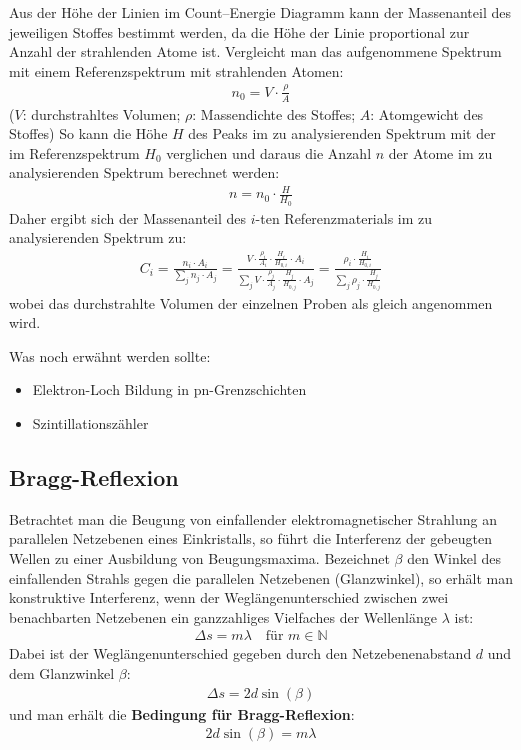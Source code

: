 \documentclass[10pt, a4paper]{article}
\begin{document}
Aus der Höhe der Linien im Count--Energie Diagramm kann der Massenanteil des jeweiligen Stoffes bestimmt werden, da die Höhe der Linie proportional zur Anzahl der strahlenden Atome ist.
Vergleicht man das aufgenommene Spektrum mit einem Referenzspektrum mit strahlenden Atomen:
\begin{align}
  n_0 = V \cdot \frac{\rho}{A}
\end{align}
($V$: durchstrahltes Volumen; $\rho$: Massendichte des Stoffes; $A$: Atomgewicht des Stoffes)
So kann die Höhe $H$ des Peaks im zu analysierenden Spektrum mit der im Referenzspektrum $H_0$ verglichen und daraus die Anzahl $n$ der Atome im zu analysierenden Spektrum berechnet werden:
\begin{align}
  n = n_0 \cdot \frac{H}{H_0}
\end{align}
Daher ergibt sich der Massenanteil des $i$-ten Referenzmaterials im zu analysierenden Spektrum zu:
\begin{align}
  C_i = \frac{n_i \cdot A_i}{\sum_j n_j \cdot A_j} = \frac{V \cdot \frac{\rho_i}{A_i} \cdot \frac{H_i}{H_{0,i}} \cdot A_i}{\sum_j V \cdot \frac{\rho_j}{A_j} \cdot \frac{H_j}{H_{0,j}}\cdot A_j} = \frac{\rho_i \cdot \frac{H_i}{H_{0,i}}}{\sum_j \rho_j \cdot \frac{H_j}{H_{0,j}}}
  \label{eq:masseanteile}
\end{align}
wobei das durchstrahlte Volumen der einzelnen Proben als gleich angenommen wird.

Was noch erwähnt werden sollte:
\begin{itemize}
  \item Elektron-Loch Bildung in pn-Grenzschichten
  \item Szintillationszähler
\end{itemize}

\subsection{Bragg-Reflexion}
Betrachtet man die Beugung von einfallender elektromagnetischer Strahlung an parallelen Netzebenen eines Einkristalls, so führt die Interferenz der gebeugten Wellen zu einer Ausbildung von Beugungsmaxima.
Bezeichnet $\beta$ den Winkel des einfallenden Strahls gegen die parallelen Netzebenen (Glanzwinkel), so erhält man konstruktive Interferenz, wenn der Weglängenunterschied zwischen zwei benachbarten Netzebenen ein ganzzahliges Vielfaches der Wellenlänge $\lambda$ ist:
\begin{align}
  \Delta s = m \lambda \quad \text{für } m \in \mathbb{N}
\end{align}
Dabei ist der Weglängenunterschied gegeben durch den Netzebenenabstand $d$ und dem Glanzwinkel $\beta$:
\begin{align}
  \Delta s = 2 d \sin(\beta)
\end{align}
und man erhält die \textbf{Bedingung für Bragg-Reflexion}:
\begin{align}
  2 d \sin(\beta) = m \lambda
  \label{eq:bragg}
\end{align}
\end{document}
